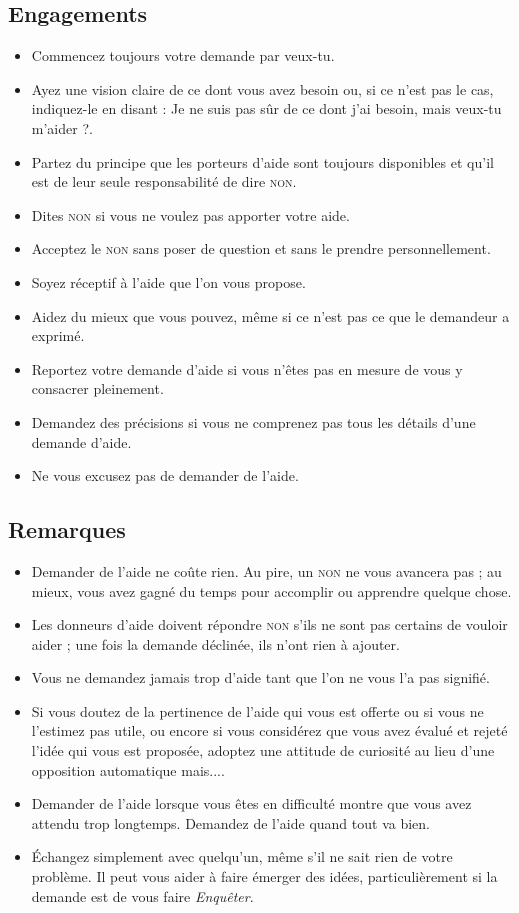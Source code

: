 \documentclass[paper=6in:9in,pagesize=pdftex,headinclude=on,footinclude=on,12pt]{scrbook}
\begin{document}
\subsection{Engagements}
\begin{itemize}
	\item Commencez toujours votre demande par \og{}veux-tu\fg{}.
	\item Ayez une vision claire de ce dont vous avez besoin ou, si ce n'est pas le cas, indiquez-le en disant : \og{}Je ne suis pas sûr
	      de ce dont j'ai besoin, mais veux-tu m'aider ?\fg{}.
    \item Partez du principe que les porteurs d'aide sont toujours disponibles et qu'il est de leur seule responsabilité de dire \textsc{non}.
    \item Dites \textsc{non} si vous ne voulez pas apporter votre aide.
    \item Acceptez le \textsc{non} sans poser de question et sans le prendre personnellement.
    \item Soyez réceptif à l'aide que l'on vous propose.
    \item Aidez du mieux que vous pouvez, même si ce n'est pas ce que le demandeur a exprimé.
    \item Reportez votre demande d'aide si vous n'êtes pas en mesure de vous y consacrer pleinement.
    \item Demandez des précisions si vous ne comprenez pas tous les détails d'une demande d'aide.
    \item Ne vous excusez pas de demander de l'aide.
\end{itemize}

\subsection{Remarques}
\begin{itemize}
	\item Demander de l'aide ne coûte rien. Au pire, un \textsc{non} ne vous avancera pas ; au mieux, vous avez gagné du temps pour
	      accomplir ou apprendre quelque chose.
	\item Les donneurs d'aide doivent répondre \textsc{non} s'ils ne sont pas certains de vouloir aider ; une fois la demande déclinée,
	      ils n'ont rien à ajouter.
	\item Vous ne demandez jamais \og{}trop\fg{} d'aide tant que l'on ne vous l'a pas signifié.
	\item Si vous doutez de la pertinence de l'aide qui vous est offerte ou si vous ne l'estimez pas utile, ou encore si vous considérez
	      que vous avez évalué et rejeté l'idée qui vous est proposée, adoptez une attitude de curiosité au lieu d'une opposition automatique
	      \og{}mais...\fg{}.
	\item Demander de l'aide lorsque vous êtes en difficulté mon\-tre que vous avez attendu trop longtemps. Demandez de l'aide quand tout va bien.
	\item Échangez simplement avec quelqu'un, même s'il ne sait rien de votre problème. Il peut vous aider à faire émerger des idées,
	      particulièrement si la demande est de vous faire \emph{Enquêter}.
\end{itemize}
\end{document}
